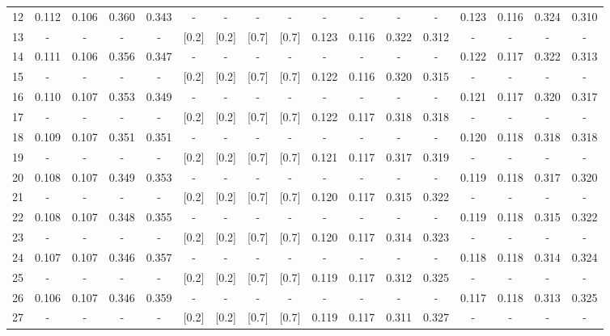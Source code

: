 \documentclass{report}
\begin{document}
\begin{appendices}
\begin{table}
\begin{tabular}{|c|cccc|cccc|cccc|cccc|}
12 & 0.112 & 0.106 & 0.360 & 0.343 &   -   &   -   &   -   &   -   &   -   &   -   &   -   &   -   & 0.123 & 0.116 & 0.324 & 0.310\\
13 &   -   &   -   &   -   &   -   & [0.2] & [0.2] & [0.7] & [0.7] & 0.123 & 0.116 & 0.322 & 0.312 &   -   &   -   &   -   &   -  \\
14 & 0.111 & 0.106 & 0.356 & 0.347 &   -   &   -   &   -   &   -   &   -   &   -   &   -   &   -   & 0.122 & 0.117 & 0.322 & 0.313\\
15 &   -   &   -   &   -   &   -   & [0.2] & [0.2] & [0.7] & [0.7] & 0.122 & 0.116 & 0.320 & 0.315 &   -   &   -   &   -   &   -  \\
16 & 0.110 & 0.107 & 0.353 & 0.349 &   -   &   -   &   -   &   -   &   -   &   -   &   -   &   -   & 0.121 & 0.117 & 0.320 & 0.317\\
17 &   -   &   -   &   -   &   -   & [0.2] & [0.2] & [0.7] & [0.7] & 0.122 & 0.117 & 0.318 & 0.318 &   -   &   -   &   -   &   -  \\
18 & 0.109 & 0.107 & 0.351 & 0.351 &   -   &   -   &   -   &   -   &   -   &   -   &   -   &   -   & 0.120 & 0.118 & 0.318 & 0.318\\
19 &   -   &   -   &   -   &   -   & [0.2] & [0.2] & [0.7] & [0.7] & 0.121 & 0.117 & 0.317 & 0.319 &   -   &   -   &   -   &   -  \\
20 & 0.108 & 0.107 & 0.349 & 0.353 &   -   &   -   &   -   &   -   &   -   &   -   &   -   &   -   & 0.119 & 0.118 & 0.317 & 0.320\\
21 &   -   &   -   &   -   &   -   & [0.2] & [0.2] & [0.7] & [0.7] & 0.120 & 0.117 & 0.315 & 0.322 &   -   &   -   &   -   &   -  \\
22 & 0.108 & 0.107 & 0.348 & 0.355 &   -   &   -   &   -   &   -   &   -   &   -   &   -   &   -   & 0.119 & 0.118 & 0.315 & 0.322\\
23 &   -   &   -   &   -   &   -   & [0.2] & [0.2] & [0.7] & [0.7] & 0.120 & 0.117 & 0.314 & 0.323 &   -   &   -   &   -   &   -  \\
24 & 0.107 & 0.107 & 0.346 & 0.357 &   -   &   -   &   -   &   -   &   -   &   -   &   -   &   -   & 0.118 & 0.118 & 0.314 & 0.324\\
25 &   -   &   -   &   -   &   -   & [0.2] & [0.2] & [0.7] & [0.7] & 0.119 & 0.117 & 0.312 & 0.325 &   -   &   -   &   -   &   -  \\
26 & 0.106 & 0.107 & 0.346 & 0.359 &   -   &   -   &   -   &   -   &   -   &   -   &   -   &   -   & 0.117 & 0.118 & 0.313 & 0.325\\
27 &   -   &   -   &   -   &   -   & [0.2] & [0.2] & [0.7] & [0.7] & 0.119 & 0.117 & 0.311 & 0.327 &   -   &   -   &   -   &   -  \\

\end{tabular}
\end{table}
\end{appendices}
\end{document}
